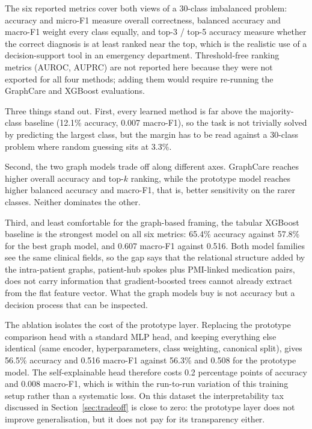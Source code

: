 The six reported metrics cover both views of a 30-class imbalanced problem:
accuracy and micro-F1 measure overall correctness, balanced accuracy and
macro-F1 weight every class equally, and top-3 / top-5 accuracy measure whether
the correct diagnosis is at least ranked near the top, which is the realistic
use of a decision-support tool in an emergency department. Threshold-free
ranking metrics (AUROC, AUPRC) are not reported here because they were not
exported for all four methods; adding them would require re-running the
GraphCare and XGBoost evaluations.

Three things stand out. First, every learned method is far above the
majority-class baseline (12.1\% accuracy, 0.007 macro-F1), so the task is not
trivially solved by predicting the largest class, but the margin has to be read
against a 30-class problem where random guessing sits at 3.3\%.

Second, the two graph models trade off along different axes. GraphCare reaches
higher overall accuracy and top-$k$ ranking, while the prototype model reaches
higher balanced accuracy and macro-F1, that is, better sensitivity on the rarer
classes. Neither dominates the other.

Third, and least comfortable for the graph-based framing, the tabular XGBoost
baseline is the strongest model on all six metrics: 65.4\% accuracy against
57.8\% for the best graph model, and 0.607 macro-F1 against 0.516. Both model
families see the same clinical fields, so the gap says that the relational
structure added by the intra-patient graphs, patient-hub spokes plus PMI-linked
medication pairs, does not carry information that gradient-boosted trees cannot
already extract from the flat feature vector. What the graph models buy is not
accuracy but a decision process that can be inspected.

The ablation isolates the cost of the prototype layer. Replacing the prototype
comparison head with a standard MLP head, and keeping everything else identical
(same encoder, hyperparameters, class weighting, canonical split), gives 56.5\%
accuracy and 0.516 macro-F1 against 56.3\% and 0.508 for the prototype model.
The self-explainable head therefore costs 0.2 percentage points of accuracy and
0.008 macro-F1, which is within the run-to-run variation of this training setup
rather than a systematic loss. On this dataset the interpretability tax
discussed in Section~\ref{sec:tradeoff} is close to zero: the prototype layer
does not improve generalisation, but it does not pay for its transparency
either. 

